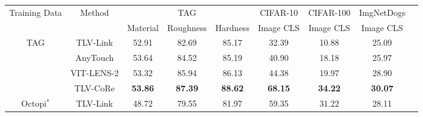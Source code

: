 \documentclass[letterpaper]{article} %
\theoremstyle{definition}                %
\theoremstyle{plain}                     %
\theoremstyle{remark}                    %
\begin{document}
\begin{table}[ht]
\centering
\setlength{\tabcolsep}{2.5mm}
\begin{tabular}{@{}c|c|ccc|c|c|cc@{}}
\toprule[1.2pt]
\multirow{2.5}{*}{Training Data} & \multirow{2.5}{*}{Method} &          & TAG       &          & CIFAR-10          &    CIFAR-100    & ImgNetDogs      \\ \cmidrule(lr){3-5} \cmidrule(lr){6-6} \cmidrule(lr){7-7} \cmidrule(lr){8-8} 
                               &                         & Material & Roughness & Hardness & Image CLS & Image CLS & Image CLS \\  \midrule
\multirow{4}{*}{TAG}           & TLV-Link                &     {\cellcolor[HTML]{F6E6E6}52.91}     &    {\cellcolor[HTML]{F6E6E6}82.69}       &     {\cellcolor[HTML]{F6E6E6}85.17}     &             {\cellcolor[HTML]{F0F0F0}32.39}   &        {\cellcolor[HTML]{F0F0F0}10.88}        &           {\cellcolor[HTML]{F0F0F0}25.09}     \\
                               & AnyTouch                &   {\cellcolor[HTML]{F6E6E6}53.64}       & {\cellcolor[HTML]{F6E6E6}84.52}          &   {\cellcolor[HTML]{F6E6E6}85.19}       &             {\cellcolor[HTML]{F0F0F0}40.90}   &        {\cellcolor[HTML]{F0F0F0}18.18}        &          {\cellcolor[HTML]{F0F0F0}25.97}      \\
                               & VIT-LENS-2              &    {\cellcolor[HTML]{F6E6E6}53.32}      &  {\cellcolor[HTML]{F6E6E6}85.94}         &   {\cellcolor[HTML]{F6E6E6}86.13}       &             {\cellcolor[HTML]{F0F0F0}44.38}   &        {\cellcolor[HTML]{F0F0F0}19.97}        &     {\cellcolor[HTML]{F0F0F0}28.90}           \\
                               & TLV-CoRe                &    {\cellcolor[HTML]{F6E6E6}\textbf{53.86}}      &      {\cellcolor[HTML]{F6E6E6}\textbf{87.39}}     &   {\cellcolor[HTML]{F6E6E6}\textbf{88.62}}       &       {\cellcolor[HTML]{F0F0F0}\textbf{68.15}}         &             {\cellcolor[HTML]{F0F0F0}\textbf{34.22}}   &      {\cellcolor[HTML]{F0F0F0}\textbf{30.07}}         \\ \midrule
\multirow{4}{*}{Octopi$^\ast$}         & TLV-Link                &    {\cellcolor[HTML]{E2F0D9}48.72}      &     {\cellcolor[HTML]{E2F0D9}79.55}      &    {\cellcolor[HTML]{E2F0D9}81.97}      &             {\cellcolor[HTML]{F0F0F0}59.35}   &         {\cellcolor[HTML]{F0F0F0}31.22}       &     {\cellcolor[HTML]{F0F0F0}28.11}           \\

\end{tabular}
\end{table}
\end{document}
